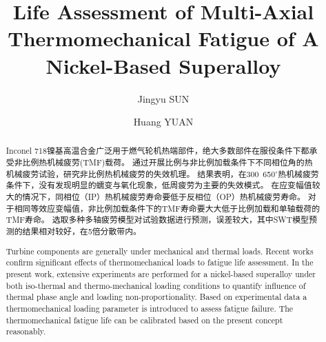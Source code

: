 \documentclass[preprint,5p,twocolumn,11pt,sort&compress]{elsarticle}
\begin{document}

\begin{frontmatter}



\title{Life Assessment of Multi-Axial Thermomechanical Fatigue of A Nickel-Based Superalloy}


\author{Jingyu SUN}
\author{Huang YUAN}

\address[label1]{School of Aerospace Engineering, Tsinghua University, Beijing, China}
\address[label2]{Department of Civil Engineering, Technical University of Darmstadt, Germany}

\begin{abstract}
Inconel 718镍基高温合金广泛用于燃气轮机热端部件，绝大多数部件在服役条件下都承受非比例热机械疲劳(TMF)载荷。
通过开展比例与非比例加载条件下不同相位角的热机械疲劳试验，研究非比例热机械疲劳的失效机理。
结果表明，在300~650$^{\circ}$热机械疲劳条件下，没有发现明显的蠕变与氧化现象，低周疲劳为主要的失效模式。
在应变幅值较大的情况下，同相位（IP）热机械疲劳寿命要低于反相位（OP）热机械疲劳寿命。
对于相同等效应变幅值，非比例加载条件下的TMF寿命要大大低于比例加载和单轴载荷的TMF寿命。
选取多种多轴疲劳模型对试验数据进行预测，误差较大，其中SWT模型预测的结果相对较好，在5倍分散带内。

Turbine components are generally under mechanical and thermal loads. Recent works confirm significant effects of thermomechanical loads to fatigue life assessment. In the present work, extensive experiments are performed for a nickel-based superalloy under both iso-thermal and thermo-mechanical loading conditions to quantify influence of thermal phase angle and loading non-proportionality. Based on experimental data a thermomechanical loading parameter is introduced to assess fatigue failure. The thermomechanical fatigue life can be calibrated based on the present concept reasonably.
\end{abstract}


\end{frontmatter}
\end{document}

